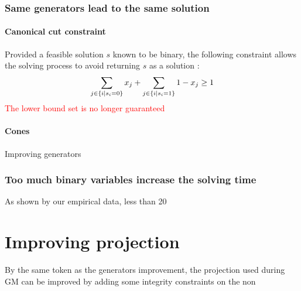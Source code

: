 \subsubsection{Same generators lead to the same solution}
\paragraph{Canonical cut constraint}
Provided a feasible solution $s$ known to be binary, the following constraint allows the solving process to avoid returning $s$ as a solution \cite{canonical_cut}:
\[
\sum_{j \in \left\lbrace i \mid s_i = 0 \right\rbrace}x_j +  \sum_{j \in \left\lbrace i \mid s_i = 1 \right\rbrace}1-x_j \geq 1
\]
\textcolor{red}{The lower bound set is no longer guaranteed}
\paragraph{Cones}

\begin{algorithm}
\caption{Improving generators}\label{alg:Generators_improvement}
\end{algorithm}
\subsubsection{Too much binary variables increase the solving time}
As shown by our empirical data, less than 20

\section{Improving projection}
By the same token as the generators improvement, the projection used during GM can be improved by adding some integrity constraints on the non 

